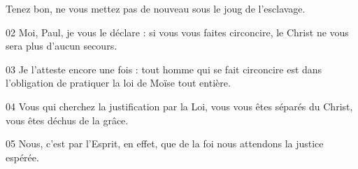 Tenez bon, ne vous mettez pas de nouveau sous le joug de l’esclavage.

02 Moi, Paul, je vous le déclare : si vous vous faites circoncire, le Christ ne vous sera plus d’aucun secours.

03 Je l’atteste encore une fois : tout homme qui se fait circoncire est dans l’obligation de pratiquer la loi de Moïse tout entière.

04 Vous qui cherchez la justification par la Loi, vous vous êtes séparés du Christ, vous êtes déchus de la grâce.

05 Nous, c’est par l’Esprit, en effet, que de la foi nous attendons la justice espérée.
